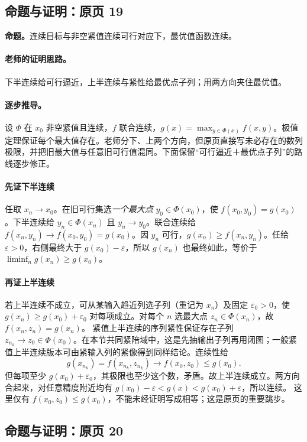 \documentclass[11pt,a4paper]{article}
\newcommand{\eps}{\varepsilon}
\theoremstyle{definition}\newtheorem{definition}{定义}\newtheorem{example}{例}
\begin{document}
\subsection{命题与证明：原页 19}

\textbf{命题。}连续目标与非空紧值连续可行对应下，最优值函数连续。

\paragraph{老师的证明思路。}下半连续给可行逼近，上半连续与紧性给最优点子列；用两方向夹住最优值。

\paragraph{逐步推导。}
设 $\Phi$ 在 $x_0$ 非空紧值且连续，$f$ 联合连续，$g(x)=\max_{y\in\Phi(x)}f(x,y)$。极值定理保证每个最大值存在。老师分下、上两个方向，但原页直接写未必存在的数列极限，并把旧最大值与任意旧可行值混同。下面保留“可行逼近＋最优点子列”的路线逐步修正。
\paragraph{先证下半连续}
任取 $x_n\to x_0$。在旧可行集选\emph{一个最大点} $y_0\in\Phi(x_0)$，使 $f(x_0,y_0)=g(x_0)$。下半连续给 $y_n\in\Phi(x_n)$ 且 $y_n\to y_0$。联合连续给 $f(x_n,y_n)\to f(x_0,y_0)=g(x_0)$。因 $y_n$ 可行，$g(x_n)\ge f(x_n,y_n)$。任给 $\eps>0$，右侧最终大于 $g(x_0)-\eps$，所以 $g(x_n)$ 也最终如此，等价于 $\liminf_n g(x_n)\ge g(x_0)$。
\paragraph{再证上半连续}
若上半连续不成立，可从某输入趋近列选子列（重记为 $x_n$）及固定 $\eps_0>0$，使 $g(x_n)\ge g(x_0)+\eps_0$ 对每项成立。对每个 $n$ 选最大点 $z_n\in\Phi(x_n)$，故 $f(x_n,z_n)=g(x_n)$。
紧值上半连续的序列紧性保证存在子列 $z_{n_k}\to z_0\in\Phi(x_0)$。在本节共同紧陪域中，这是先抽输出子列再用闭图；一般紧值上半连续版本可由紧输入列的紧像得到同样结论。连续性给
\[g(x_{n_k})=f(x_{n_k},z_{n_k})\longrightarrow f(x_0,z_0)\le g(x_0).\]
但每项至少 $g(x_0)+\eps_0$，其极限也至少这个数，矛盾。故上半连续成立。两方向合起来，对任意精度附近均有 $g(x_0)-\eps<g(x)<g(x_0)+\eps$，所以连续。
这里仅有 $f(x_0,z_0)\le g(x_0)$，不能未经证明写成相等；这是原页的重要跳步。


\subsection{命题与证明：原页 20}
\end{document}
